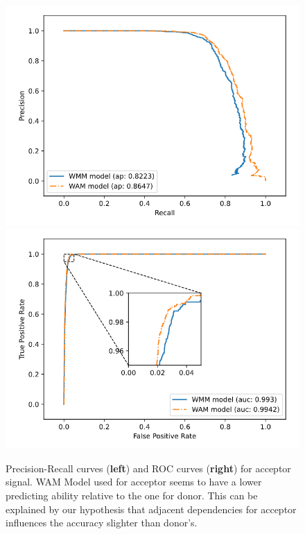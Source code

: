 \documentclass[journal,twoside]{IEEEtran}
\begin{document}
\begin{figure}[htbp]
\centerline{\includegraphics[scale=0.35]{Pics/WMM_WAM_prcurve_acceptor.png}
    \includegraphics[scale=0.35]{Pics/WMM_WAM_roccurve_acceptor.png}}
\caption{Precision-Recall curves (\textbf{left}) and ROC curves (\textbf{right}) for acceptor signal. WAM Model used for acceptor seems to have a lower predicting ability relative to the one for donor. This can be explained by our hypothesis that adjacent dependencies for acceptor influences the accuracy slighter than donor's. }
\label{fig7}
\end{figure}
\end{document}
